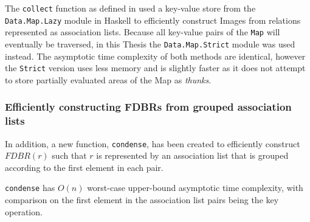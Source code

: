 \documentclass[../main.tex]{subfiles}
\begin{document}
The \texttt{collect} function as defined in \cite{agboola2015extensible} used a key-value store from the \texttt{Data.Map.Lazy} module in Haskell to efficiently construct Images from relations represented as association lists.  Because all key-value pairs of the \texttt{Map} will eventually be traversed, in this Thesis the \texttt{Data.Map.Strict} module was used instead.  The asymptotic time complexity of both methods are identical, however the \texttt{Strict} version uses less memory and is slightly faster as it does not attempt to store partially evaluated areas of the Map as {\em thunks}.






\subsubsection{Efficiently constructing FDBRs from grouped association lists}
In addition, a new function, \texttt{condense}, has been created to efficiently construct $FDBR(r)$ such that $r$ is represented by an association list that is grouped according to the first element in each pair.


\begin{theorem}
	\texttt{condense} has $O(n)$ worst-case upper-bound asymptotic time complexity, with comparison on the first element in the association list pairs being the key operation.
\end{theorem}
\end{document}
